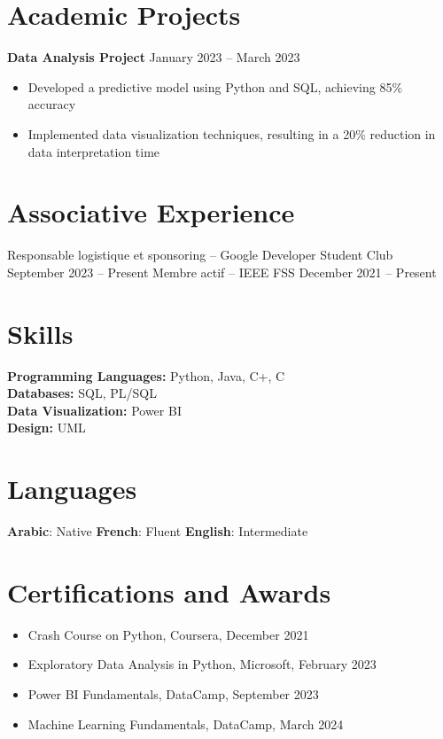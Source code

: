 \documentclass[9pt]{article}
\newcommand{\cvitem}[2]{#2}
\begin{document}
\section*{Academic Projects}
\textbf{Data Analysis Project} \hfill January 2023 -- March 2023
\begin{itemize}[itemsep=-0.2em]
    \item Developed a predictive model using Python and SQL, achieving 85\% accuracy
    \item Implemented data visualization techniques, resulting in a 20\% reduction in data interpretation time
\end{itemize}

\section*{Associative Experience}
Responsable logistique et sponsoring -- Google Developer Student Club \hfill September 2023 -- Present
Membre actif -- IEEE FSS \hfill December 2021 -- Present

\section*{Skills}
\cvitem{}{%
  \textbf{Programming Languages:} Python, Java, C\++, C \\
  \textbf{Databases:} SQL, PL/SQL \\
  \textbf{Data Visualization:} Power BI \\
  \textbf{Design:} UML
}

\section*{Languages}
\begin{center}
\textbf{Arabic}: Native \hspace{1em} \textbf{French}: Fluent \hspace{1em} \textbf{English}: Intermediate
\end{center}

\section*{Certifications and Awards}
\begin{itemize}[itemsep=-0.2em] 
    \item Crash Course on Python, Coursera, December 2021
    \item Exploratory Data Analysis in Python, Microsoft, February 2023
    \item Power BI Fundamentals, DataCamp, September 2023
    \item Machine Learning Fundamentals, DataCamp, March 2024
\end{itemize}
\end{document}
